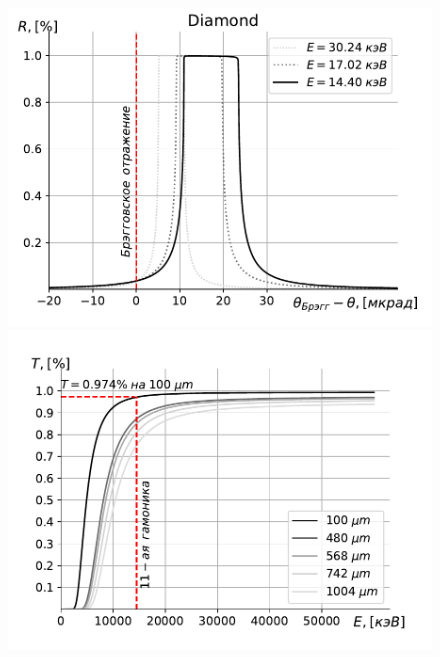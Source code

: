 \documentclass[14pt,a4paper]{extarticle}
\numberwithin{equation}{section}
\begin{document}
\begin{figure}[htbp]
	\centering  
	\begin{minipage}{0.49\textwidth}
		\centering
		\includegraphics[width=\textwidth]{pic/Diamond_bragg_R.pdf}
		\caption{}
		\label{fig:bragg_R}
	\end{minipage}\hfill
	\begin{minipage}{0.49\textwidth}
		\centering
		\includegraphics[width=\textwidth]{pic/bragg_T.pdf}
		\caption{}
		\label{fig:bragg_T}
	\end{minipage}    
	\begin{minipage}{1.\textwidth}
		\centering  

\end{minipage}
\end{figure}
\end{document}
